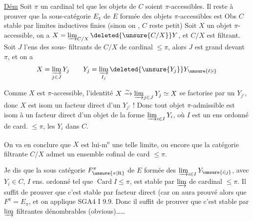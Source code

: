 \uline{Dém} Soit $\pi$ un cardinal  tel que les objets de $C$ soient $\pi$-accessibles. Il reste à prouver que la sous-catégorie $E_\pi$ de $E$ formée des objets $\pi$-accessibles est     Obs $C$ stable par limites inductives finies (sinon on , $C$ reste  petit) Soit $X$ un objet $\pi$-accessible, on a  $X=\varinjlim_{C/X}\deleted{\unsure{C/X}}Y$, et $C/X$ est filtrant.  Soit $J$ l'ens des sous-  filtrants  de $C/X$ de cardinal $\leq\pi$, alors $J$ est  grand devant $\pi$, et on a
\[
 X=\varinjlim_{j\in J}Y_j\qquad Y_j=\varinjlim_{I_j}\deleted{\unsure{Y_j}}Y_{\unsure{\ell|i}}
\]

Comme $X$ est $\pi$-accessible,  l'identité $X\xrightarrow{\sim}\varinjlim_{j\in J}Y_j\simeq X$ se factorise par un $Y_{j'}$, donc $X$ est isom  un facteur direct d'un $Y_{j'}$ ! Donc tout objet $\pi$-admissible est isom à un facteur direct d'un objet de la forme $\varinjlim_{i\in I}Y_i$, où  $I$ est un ens  ordonné de card. $\leq\pi$, les $Y_i$ dans $C$.


On va en conclure que  $X$ est  lui-m\textsuperscript{e} une telle limite, ou encore que la catégorie filtrante $C/X$ admet un ensemble cofinal de card $\leq\pi$. 

Je dis que la  sous catégorie $F^\pi_{\unsure{\pi|\mathrm R}}$ de $E$ formée des $\varinjlim_{i\in I} Y_{\unsure{i|j}}$, avec $Y_i\in C$, $I$ ens. ordonné tel que $\operatorname{Card} I\leq\pi$, est stable par $\varinjlim$ de cardinal $\leq\pi$. Il suffit de prouver que c'est stable par facteur direct (car on aura prouvé alors que $F^\pi=E_\pi$, et on applique SGA4 I 9.9. Donc il suffit de prouver que c'est stable par $\varinjlim$ filtrantes dénombrables (obvious)\ldots\ldots
